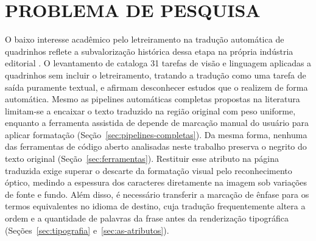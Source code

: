 \documentclass[
    12pt,
    openright,
    oneside,
    a4paper,
    chapter=TITLE,
    section=TITLE,
    english,
    brazilian,
    brazil
]{abntex2}
\begin{document}
\section{PROBLEMA DE PESQUISA}
\label{sec:problema}

O baixo interesse acadêmico pelo letreiramento na tradução automática de quadrinhos reflete a subvalorização histórica dessa etapa na própria indústria editorial \cite{assis2015letterer}. O levantamento de  cataloga 31 tarefas de visão e linguagem aplicadas a quadrinhos sem incluir o letreiramento, tratando a tradução como uma tarefa de saída puramente textual, e  afirmam desconhecer estudos que o realizem de forma automática. Mesmo as pipelines automáticas completas propostas na literatura \cite{hinami2021fullyautomatedmangatranslation, narasimhan2025crossing} limitam-se a encaixar o texto traduzido na região original com peso uniforme, enquanto a ferramenta assistida de  depende de marcação manual do usuário para aplicar formatação (Seção~\ref{sec:pipelines-completas}). Da mesma forma, nenhuma das ferramentas de código aberto analisadas neste trabalho preserva o negrito do texto original (Seção~\ref{sec:ferramentas}). Restituir esse atributo na página traduzida exige superar o descarte da formatação visual pelo reconhecimento óptico, medindo a espessura dos caracteres diretamente na imagem sob variações de fonte e fundo. Além disso, é necessário transferir a marcação de ênfase para os termos equivalentes no idioma de destino, cuja tradução frequentemente altera a ordem e a quantidade de palavras da frase antes da renderização tipográfica (Seções~\ref{sec:tipografia} e~\ref{sec:as-atributos}).
\end{document}
